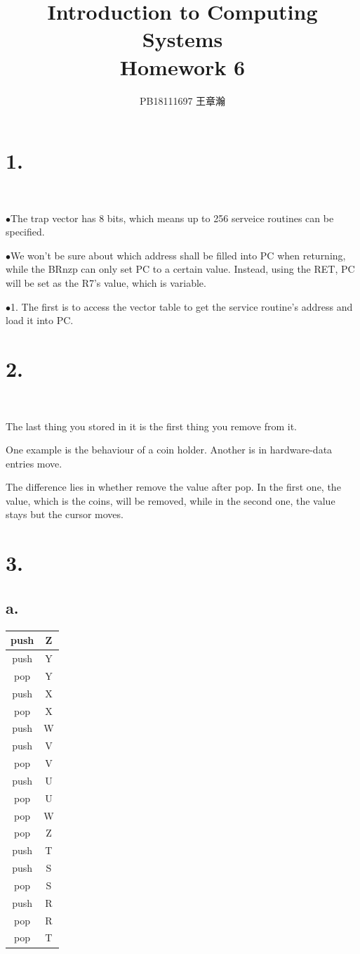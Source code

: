 \documentclass[11pt,a4paper]{article}
\title{Introduction to Computing Systems\\Homework 6}
\author{PB18111697 王章瀚}
\newcommand{\keypoint}[1]{$\bullet$#1\par}
\begin{document}
	\maketitle
	\section*{1.}
	\ \par
	\keypoint{The trap vector has 8 bits, which means up to 256 serveice routines can be specified.}
	\keypoint{We won't be sure about which address shall be filled into PC when returning, while the BRnzp can only set PC to a certain value. Instead, using the RET, PC will be set as the R7's value, which is variable.}
	\keypoint{1. The first is to access the vector table to get the service routine's address and load it into PC.}
	
	\section*{2.}
	\ \par
	The last thing you stored in it is the first thing you remove from it.\par
	One example is the behaviour of a coin holder. Another is in hardware-data entries move.\par
	The difference lies in whether remove the value after pop. In the first one, the value, which is the coins, will be removed, while in the second one, the value stays but the cursor moves.\par
	
	\section*{3.}
	\subsection*{a.}
	\begin{tabular}{|c|c|}
		\hline 
		push & Z \\ 
		\hline 
		push & Y \\ 
		\hline 
		pop & Y \\ 
		\hline 
		push & X \\ 
		\hline 
		pop & X \\ 
		\hline 
		push & W \\ 
		\hline 
		push & V \\ 
		\hline 
		pop & V \\ 
		\hline 
		push & U \\ 
		\hline 
		pop & U \\ 
		\hline 
		pop & W \\ 
		\hline 
		pop & Z \\ 
		\hline 
		push & T \\ 
		\hline 
		push & S \\ 
		\hline 
		pop & S \\ 
		\hline 
		push & R \\ 
		\hline 
		pop & R \\ 
		\hline 
		pop & T \\ 
		\hline 
	\end{tabular} 
\end{document}
